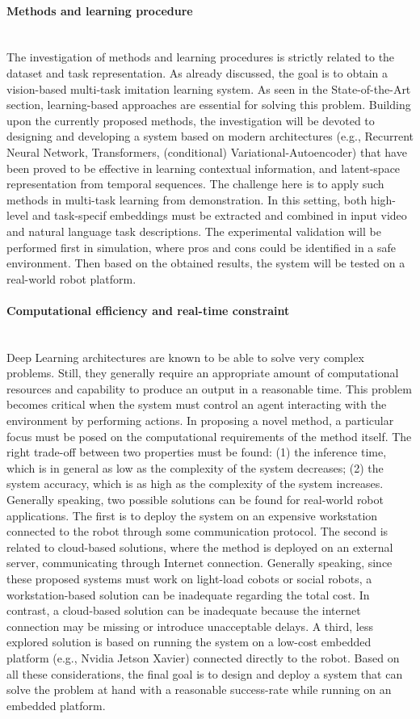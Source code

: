 \paragraph{Methods and learning procedure} \mbox{} \\
The investigation of methods and learning procedures is strictly related to the dataset and task representation. As already discussed, the goal is to obtain a vision-based multi-task imitation learning system. As seen in the State-of-the-Art section, learning-based approaches are essential for solving this problem. Building upon the currently proposed methods, the investigation will be devoted to designing and developing a system based on modern architectures (e.g., Recurrent Neural Network, Transformers, (conditional) Variational-Autoencoder) that have been proved to be effective in learning contextual information, and latent-space representation from temporal sequences. The challenge here is to apply such methods in multi-task learning from demonstration. In this setting, both high-level and task-specif embeddings must be extracted and combined in input video and natural language task descriptions. The experimental validation will be performed first in simulation, where pros and cons could be identified in a safe environment. Then based on the obtained results, the system will be tested on a real-world robot platform.
\paragraph{Computational efficiency and real-time constraint} \mbox{} \\
Deep Learning architectures are known to be able to solve very complex problems. Still, they generally require an appropriate amount of computational resources and capability to produce an output in a reasonable time. This problem becomes critical when the system must control an agent interacting with the environment by performing actions. In proposing a novel method, a particular focus must be posed on the computational requirements of the method itself. The right trade-off between two properties must be found: (1) the inference time, which is in general as low as the complexity of the system decreases; (2) the system accuracy, which is as high as the complexity of the system increases. Generally speaking, two possible solutions can be found for real-world robot applications. The first is to deploy the system on an expensive workstation connected to the robot through some communication protocol. The second is related to cloud-based solutions, where the method is deployed on an external server, communicating through Internet connection. Generally speaking, since these proposed systems must work on light-load cobots or social robots, a workstation-based solution can be inadequate regarding the total cost. In contrast, a cloud-based solution can be inadequate because the internet connection may be missing or introduce unacceptable delays. A third, less explored solution is based on running the system on a low-cost embedded platform (e.g., Nvidia Jetson Xavier) connected directly to the robot. Based on all these considerations, the final goal is to design and deploy a system that can solve the problem at hand with a reasonable success-rate while running on an embedded platform.
